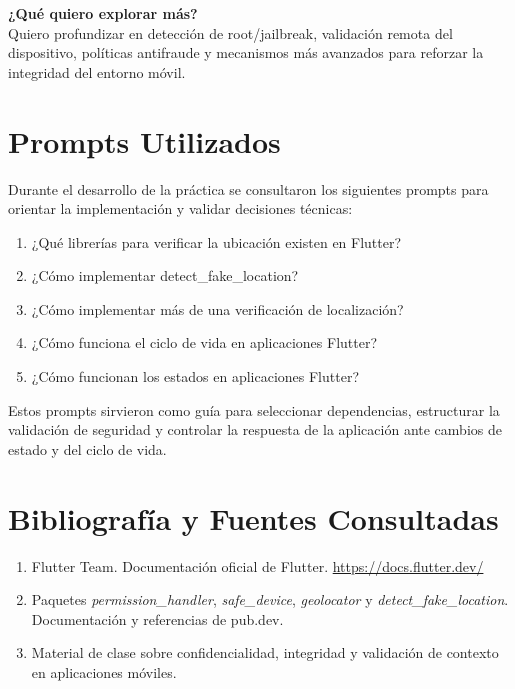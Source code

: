 \documentclass[12pt, a4paper]{article}
\begin{document}
\vspace{6pt}
\textbf{¿Qué quiero explorar más?}\\[4pt]
Quiero profundizar en detección de root/jailbreak, validación remota del dispositivo, políticas antifraude y mecanismos más avanzados para reforzar la integridad del entorno móvil.

\section{Prompts Utilizados}

Durante el desarrollo de la práctica se consultaron los siguientes prompts para orientar la implementación y validar decisiones técnicas:

\begin{enumerate}[topsep=4pt]
    \item ¿Qué librerías para verificar la ubicación existen en Flutter?
    \item ¿Cómo implementar detect\_fake\_location?
    \item ¿Cómo implementar más de una verificación de localización?
    \item ¿Cómo funciona el ciclo de vida en aplicaciones Flutter?
    \item ¿Cómo funcionan los estados en aplicaciones Flutter?
\end{enumerate}

Estos prompts sirvieron como guía para seleccionar dependencias, estructurar la validación de seguridad y controlar la respuesta de la aplicación ante cambios de estado y del ciclo de vida.

\section{Bibliografía y Fuentes Consultadas}
\begin{enumerate}[topsep=4pt]
    \item Flutter Team. Documentación oficial de Flutter. \url{https://docs.flutter.dev/}
    \item Paquetes \textit{permission\_handler}, \textit{safe\_device}, \textit{geolocator} y \textit{detect\_fake\_location}. Documentación y referencias de pub.dev.
    \item Material de clase sobre confidencialidad, integridad y validación de contexto en aplicaciones móviles.
\end{enumerate}
\end{document}
